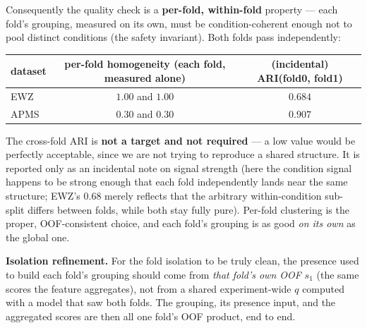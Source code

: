 \documentclass[11pt]{article}
\begin{document}
Consequently the quality check is a \textbf{per-fold, within-fold} property --- each fold's grouping,
measured on its own, must be condition-coherent enough not to pool distinct conditions (the safety
invariant). Both folds pass independently:
\begin{center}\small
\begin{tabular}{lcc}
\toprule
dataset & per-fold homogeneity (each fold, measured alone) & (incidental) ARI(fold0, fold1) \\
\midrule
EWZ  & $1.00$ and $1.00$ & $0.684$ \\
APMS & $0.30$ and $0.30$ & $0.907$ \\
\bottomrule
\end{tabular}
\end{center}
The cross-fold ARI is \textbf{not a target and not required} --- a low value would be perfectly
acceptable, since we are not trying to reproduce a shared structure. It is reported only as an
incidental note on signal strength (here the condition signal happens to be strong enough that each
fold independently lands near the same structure; EWZ's $0.68$ merely reflects that the arbitrary
within-condition sub-split differs between folds, while both stay fully pure). Per-fold clustering is
the proper, OOF-consistent choice, and each fold's grouping is as good \emph{on its own} as the global
one.

\textbf{Isolation refinement.} For the fold isolation to be truly clean, the presence used to build
each fold's grouping should come from \emph{that fold's own OOF} $s_1$ (the same scores the feature
aggregates), not from a shared experiment-wide $q$ computed with a model that saw both folds. The
grouping, its presence input, and the aggregated scores are then all one fold's OOF product, end to
end.
\end{document}
